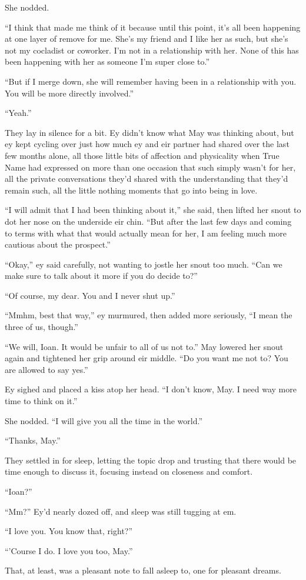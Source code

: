 She nodded.

``I think that made me think of it because until this point, it's all been happening at one layer of remove for me. She's my friend and I like her as such, but she's not my cocladist or coworker. I'm not in a relationship with her. None of this has been happening with her as someone I'm super close to.''

``But if I merge down, she will remember having been in a relationship with you. You will be more directly involved.''

``Yeah.''

They lay in silence for a bit. Ey didn't know what May was thinking about, but ey kept cycling over just how much ey and eir partner had shared over the last few months alone, all those little bits of affection and physicality when True Name had expressed on more than one occasion that such simply wasn't for her, all the private conversations they'd shared with the understanding that they'd remain such, all the little nothing moments that go into being in love.

``I will admit that I had been thinking about it,'' she said, then lifted her snout to dot her nose on the underside eir chin. ``But after the last few days and coming to terms with what that would actually mean for her, I am feeling much more cautious about the prospect.''

``Okay,'' ey said carefully, not wanting to jostle her snout too much. ``Can we make sure to talk about it more if you do decide to?''

``Of course, my dear. You and I never shut up.''

``Mmhm, best that way,'' ey murmured, then added more seriously, ``I mean the three of us, though.''

``We will, Ioan. It would be unfair to all of us not to.'' May lowered her snout again and tightened her grip around eir middle. ``Do you want me not to? You are allowed to say yes.''

Ey sighed and placed a kiss atop her head. ``I don't know, May. I need way more time to think on it.''

She nodded. ``I will give you all the time in the world.''

``Thanks, May.''

They settled in for sleep, letting the topic drop and trusting that there would be time enough to discuss it, focusing instead on closeness and comfort.

``Ioan?''

``Mm?'' Ey'd nearly dozed off, and sleep was still tugging at em.

``I love you. You know that, right?''

``'Course I do. I love you too, May.''

That, at least, was a pleasant note to fall asleep to, one for pleasant dreams.
